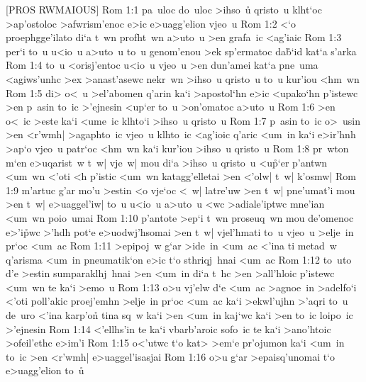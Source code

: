 [PROS RWMAIOUS]
\vs Rom 1:1
pa~uloc
do~uloc
>ihso~u\r{}
qristo~u
klht`oc
>ap'ostoloc
>afwrism'enoc
e>ic
e>uagg'elion
vjeo~u\bibvsend
\vs Rom 1:2
<`o
proephgge'ilato
di`a
t~wn
profht~wn
a>uto~u
>en
grafa~ic
<ag'iaic\bibvsend
\vs Rom 1:3
per`i
to~u
u<io~u
a>uto~u
to~u
genom'enou
>ek
sp'ermatoc
da\r{b}`id
kat`a
s'arka\bibvsend
\vs Rom 1:4
to~u
<orisj'entoc
u<io~u
vjeo~u
>en
dun'amei
kat`a
pne~uma
<agiws'unhc
>ex
>anast'asewc
nekr~wn
>ihso~u
qristo~u
to~u
kur'iou
<hm~wn\bibvsend
\vs Rom 1:5
di>
o<~u
>el'abomen
q'arin
ka`i
>apostol`hn
e>ic
<upako`hn
p'istewc
>en
p~asin
to~ic
>'ejnesin
<up`er
to~u
>on'omatoc
a>uto~u\bibvsend
\vs Rom 1:6
>en
o<~ic
>este
ka`i
<ume~ic
klhto`i
>ihso~u
qristo~u\bibvsend
\vs Rom 1:7
p~asin
to~ic
o>~usin
>en
<r'wmh|
>agaphto~ic
vjeo~u
klhto~ic
<ag'ioic
q'aric
<um~in
ka`i
e>ir'hnh
>ap`o
vjeo~u
patr`oc
<hm~wn
ka`i
kur'iou
>ihso~u
qristo~u\bibvsend
\vs Rom 1:8
pr~wton
m`en
e>uqarist~w
t~w|
vje~w|
mou
di`a
>ihso~u
qristo~u
<u\r{p}`er
p'antwn
<um~wn
<'oti
<h
p'istic
<um~wn
katagg'elletai
>en
<'olw|
t~w|
k'osmw|\bibvsend
\vs Rom 1:9
m'artuc
g'ar
mo'u
>estin
<o
vje`oc
<~w|
latre'uw
>en
t~w|
pne'umat'i
mou
>en
t~w|
e>uaggel'iw|
to~u
u<io~u
a>uto~u
<wc
>adiale'iptwc
mne'ian
<um~wn
poio~umai\bibvsend
\vs Rom 1:10
p'antote
>ep`i
t~wn
proseuq~wn
mou
de'omenoc
e>'i\r{p}wc
>'hdh
pot`e
e>uodwj'hsomai
>en
t~w|
vjel'hmati
to~u
vjeo~u
>elje~in
pr`oc
<um~ac\bibvsend
\vs Rom 1:11
>epipoj~w
g`ar
>ide~in
<um~ac
<'ina
ti
metad~w
q'arisma
<um~in
pneumatik`on
e>ic
t`o
sthriqj~hnai
<um~ac\bibvsend
\vs Rom 1:12
to~uto
d'e
>estin
sumparaklhj~hnai
>en
<um~in
di`a
t~hc
>en
>all'hloic
p'istewc
<um~wn
te
ka`i
>emo~u\bibvsend
\vs Rom 1:13
o>u
vj'elw
d`e
<um~ac
>agnoe~in
>adelfo`i
<'oti
poll'akic
proej'emhn
>elje~in
pr`oc
<um~ac
ka`i
>ekwl'ujhn
>'aqri
to~u
de~uro
<'ina
karp'on\r{}
tina
sq~w
ka`i
>en
<um~in
kaj`wc
ka`i
>en
to~ic
loipo~ic
>'ejnesin\bibvsend
\vs Rom 1:14
<'ellhs'in
te
ka`i
vbarb'aroic
sofo~ic
te
ka`i
>ano'htoic
>ofeil'ethc
e>im'i\bibvsend
\vs Rom 1:15
o<'utwc
t`o
kat>
>em`e
pr'ojumon
ka`i
<um~in
to~ic
>en
<r'wmh|
e>uaggel'isasjai\bibvsend
\vs Rom 1:16
o>u
g`ar
>epaisq'unomai
t`o
e>uagg'elion
to~u\r{}

